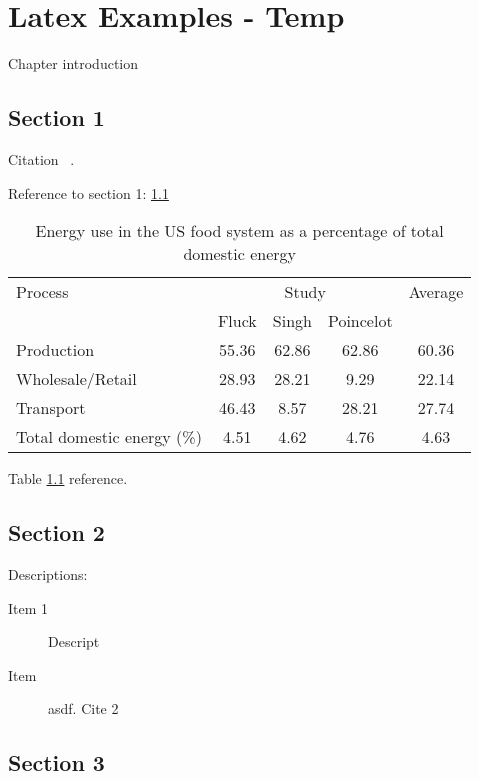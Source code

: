 \chapter{Latex Examples - Temp} 

Chapter introduction

\section{Section 1}
\label{sec:sec-1}

Citation ~\cite{s:source1}.

Reference to section 1: \ref{sec:sec-1}

\begin{table}[h]
\centering
\caption{Energy use in the US food system as a percentage of total domestic energy}
\label{tab_agric_energy}

\vspace{6pt}
\begin{tabular}{lcccc}
\toprule
Process & \multicolumn{3}{c}{Study} & Average \\
\cmidrule(r){2-4}
 & Fluck & Singh & Poincelot & \\
\midrule
Production & 55.36  & 62.86 & 62.86 & 60.36 \\
Wholesale/Retail & 28.93    & 28.21 & 9.29  & 22.14 \\
Transport & 46.43   & 8.57  & 28.21 & 27.74 \\
\midrule
\midrule
Total domestic energy (\%) & 4.51   & 4.62  & 4.76  & 4.63 \\
\bottomrule
\end{tabular}
\end{table}

Table \ref{tab_agric_energy} reference.

\section{Section 2}
\label{sec:sec-2}

Descriptions:

\begin{description}

\item[Item 1]
Descript

\item[Item]
asdf. Cite 2 ~\cite{s:source2}

\end{description}

\section{Section 3}

